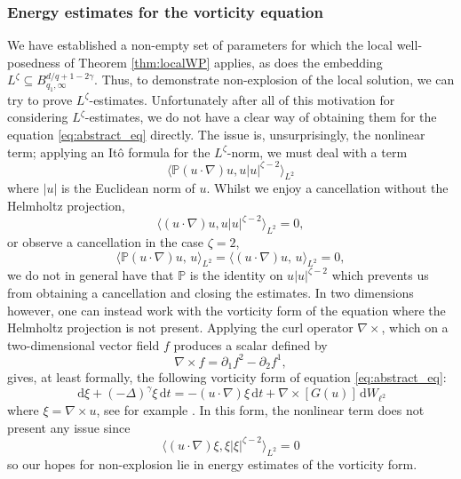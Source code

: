 \documentclass[11pt, a4paper,oneside, reqno]{amsart}
\theoremstyle{remark} %
\theoremstyle{definition} %
\numberwithin{theorem}{section}
\numberwithin{equation}{section}
\renewcommand{\P}{{\mathbb P}}
\newcommand{\abs}[1]{\vert #1 \vert}
\newcommand{\inner}[2]{\langle #1,\, #2 \rangle}
\newcommand{\del}{\Delta}
\newcommand{\grad}{\nabla}
\newcommand{\gam}{\gamma}
\newcommand{\dd}{\hspace{2pt}\mathrm{d}}
\begin{document}
\subsubsection{Energy estimates for the vorticity equation}
We have established a non-empty set of parameters for which the local well-posedness of Theorem \ref{thm:localWP} applies, as does the embedding $L^{\zeta} \subseteq B^{d/q+1-2\gam}_{q_1,\infty}$. Thus, to demonstrate non-explosion of the local solution, we can try to prove $L^\zeta$-estimates. Unfortunately after all of this motivation for considering $L^\zeta$-estimates, we do not have a clear way of obtaining them for the equation \eqref{eq:abstract_eq} directly. The issue is, unsurprisingly, the nonlinear term; applying an It\^{o} formula for the $L^\zeta$-norm, we must deal with a term
$$\big\langle\P (u \cdot \nabla)u,u\abs{u}^{\zeta-2}\big\rangle_{L^2}$$
where $\abs{u}$ is the Euclidean norm of $u$. Whilst we enjoy a cancellation without the Helmholtz projection,
$$\big\langle(u \cdot \nabla)u, u\abs{u}^{\zeta-2}\big\rangle_{L^2} = 0,$$
or observe a cancellation in the case $\zeta=2$,
$$\inner{\P (u \cdot \nabla)u}{u}_{L^2} = \inner{ (u \cdot \nabla)u}{u}_{L^2} = 0,$$
we do not in general have that $\P$ is the identity on $u\abs{u}^{\zeta-2}$ which prevents us from obtaining a cancellation and closing the estimates. In two dimensions however, one can instead work with the vorticity form of the equation where the Helmholtz projection is not present. Applying the curl operator $\nabla \times$, which on a two-dimensional vector field $f$ produces a scalar defined by $$ \nabla \times f = \partial_1f^2 - \partial_2f^1,$$
gives, at least formally,
the following vorticity form of equation \eqref{eq:abstract_eq}:
\begin{equation} \label{eq: firstvorticity} \dd \xi + (-\del)^\gam \xi \dd t  = -(u \cdot \grad)\xi \dd t + \nabla \times \left[ G(u)\right] \dd W_{\ell^2}\end{equation}
where $\xi = \nabla \times u$, see for example \cite[Chapter 12]{robinson2016three}. In this form, the nonlinear term does not present any issue since
$$\big\langle (u \cdot \nabla)\xi,\xi\abs{\xi}^{\zeta-2}\big\rangle_{L^2} = 0$$
so our hopes for non-explosion lie in energy estimates of the vorticity form.
\end{document}
